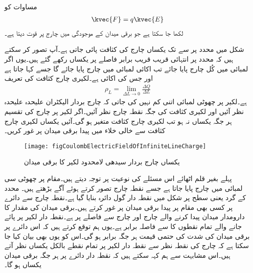 مساوات  کو
\begin{align}
\kvec{F}=q \kvec{E}
\end{align}
لکھا جا سکتا ہے جو برقی میدان  کے موجودگی میں چارج  پر قوت  دیتا ہے۔


شکل  میں  محدد پر  سے  تک یکساں چارج کی کثافت پائی جاتی ہے۔آپ تصور کر سکتے ہیں کہ  محدد پر انتہائی قریب قریب برابر فاصلے پر یکساں  رکھے گئے ہیں۔یوں اگر  لمبائی میں کُل  چارج پایا جائے تب اکائی لمبائی میں  چارج پایا جائے گا جسے    کہا جاتا ہے اور جس کی اکائی  ہے۔لکیری چارج کثافت کی تعریف
\begin{align}
\rho_L=\lim_{\Delta L \to 0}\frac{\Delta Q}{\Delta L}
\end{align}
ہے۔لکیر پر چھوٹی لمبائی  اتنی کم نہیں کی جاتی کہ چارج بردار الیکٹران علیحدہ علیحدہ نظر آئیں اور لکیری کثافت کی جگہ نقطہ چارج نظر آئیں۔اگر لکیر پر چارج کی تقسیم ہر جگہ یکساں نہ ہو تب لکیری چارج کثافت متغیر ہو گی۔آئیں یکساں لکیری چارج کثافت سے خالی خلاء میں پیدا برقی میدان پر غور کریں۔ 
 \begin{figure}
\centering
\texttt{[image: figCoulombElectricFieldOfInfiniteLineCharge]}
\caption{یکساں چارج بردار سیدھی لامحدود لکیر  کا برقی میدان}
\label{شکل_کولومب_لامحدود_لکیر_پر_چارج_کا_میدان}
\end{figure}

پہلے بغیر قلم اٹھائے اس مسئلے کی نوعیت پر توجہ دیتے ہیں۔مقام  پر  چھوٹی سی لمبائی  میں  چارج پایا جاتا ہے جسے نقطہ چارج تصور کرتے ہوئے آگے بڑھتے ہیں۔ محدد کے گرد  یعنی   سطح پر  شکل  میں نقطہ دار گول دائرہ بنایا گیا ہے۔نقطہ چارج  سے دائرے پر کسی بھی مقام پر پیدا برقی میدان پر غور کرتے ہیں۔برقی میدان کی مقدار کا دارومدار میدان پیدا کرنے والے چارج اور چارج سے فاصلے پر ہے۔نقطہ دار لکیر پر پائے جانے والے تمام نقطوں کا  سے فاصلہ برابر ہے۔یوں ہم توقع کرتے ہیں کہ اس دائرے پر برقی میدان کی شدت کی حتمی قیمت ہر جگہ برابر ہو گی۔اس کو یوں بھی بیان کیا جا سکتا ہے کہ چارج کی نقطہ نظر سے نقطہ دار لکیر پر تمام نقطے بالکل یکساں نظر آتے ہیں۔اس مشابہت سے ہم کہہ سکتے ہیں کہ نقطہ دار دائرے پر ہر جگہ برقی میدان یکساں ہو گا۔ 

